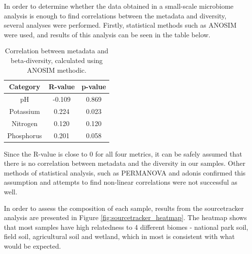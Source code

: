 \documentclass[12pt,twocolumn]{article}
\begin{document}
\par
In order to determine whether the data obtained in a small-scale microbiome analysis is enough to find correlations between the metadata and diversity, several analyses were performed. Firstly, statistical methods such as ANOSIM\cite{CLARKE1993} were used, and results of this analysis can be seen in the table below.
\begin{table}[ht!]
	\begin{center}
		\label{tab:table_correlation}
		\begin{tabular}{c|c|c}
			\textbf{Category} & \textbf{R-value} & \textbf{p-value}\\
			\hline
			pH & -0.109 & 0.869\\
			Potassium & 0.224 & 0.023\\
			Nitrogen & 0.120 & 0.120 \\
			Phosphorus & 0.201 & 0.058\\
		\end{tabular}
		\caption{Correlation between metadata and beta-diversity, calculated using ANOSIM\cite{CLARKE1993} methodic.}
	\end{center}
\end{table}
\par
Since the R-value is close to 0 for all four metrics, it can be safely assumed that there is no correlation between metadata and the diversity in our samples. Other methods of statistical analysis, such as PERMANOVA and adonis confirmed this assumption and attempts to find non-linear correlations were not successful as well.
\par

In order to assess the composition of each sample, results from the sourcetracker analysis are presented in Figure \ref{fig:sourcetracker_heatmap}. The heatmap shows that most samples have high relatedness to 4 different biomes - national park soil, field soil, agricultural soil and wetland, which in most is consistent with what would be expected. 
\end{document}
